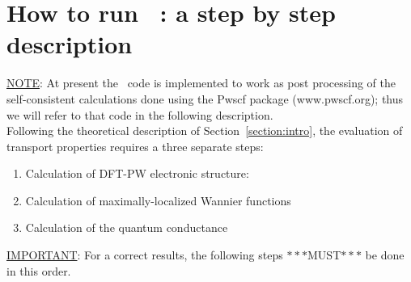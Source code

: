 
\thispagestyle{empty}
\section{How to run \WANT\ : a step by step description}\label{section:run}

\noindent \underline {NOTE}: At present the \WANT\ code is
implemented to work as post processing of the self-consistent
calculations done using the Pwscf package (www.pwscf.org); thus we
will refer to that code in the following description.\\

\noindent Following the theoretical description of
Section~\ref{section:intro}, the evaluation of transport
properties requires a three separate steps:

\begin{enumerate}
\item Calculation of DFT-PW electronic structure:
\item Calculation of maximally-localized Wannier functions
\item Calculation of the quantum conductance
\end{enumerate}

\noindent \underline{IMPORTANT}: For a correct results, the
following steps $***$MUST$***$ be done in this order.

